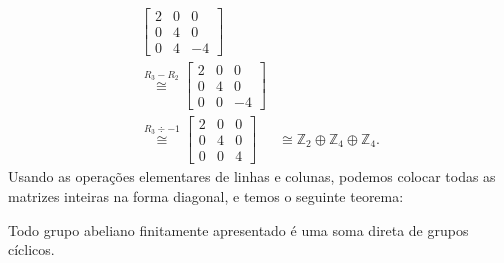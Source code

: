 \begin{align*}
\begin{bmatrix}
        	2 & 0 & 0 \\
        	0 & 4 & 0 \\
        	0 & 4 & -4
        	\end{bmatrix}& \\ \stackrel{R_3 - R_2}{\cong} 
        	\begin{bmatrix}
        	2 & 0 & 0 \\
        	0 & 4 & 0 \\
        	0 & 0 & -4 
        	\end{bmatrix}& \\ \stackrel{R_3\div-1}{\cong} 
        	\begin{bmatrix}
        	2 & 0 & 0 \\
        	0 & 4 & 0 \\
        	0 & 0 & 4
        	\end{bmatrix}& \cong \mathbb{Z}_2\oplus\mathbb{Z}_4\oplus\mathbb{Z}_4.
    	\end{align*}
    	Usando as operações 
    	elementares de linhas e colunas, podemos colocar todas as matrizes inteiras na forma diagonal, 
    	e temos o seguinte teorema:
    	\begin{theorem}
    	\label{teorema fundamental abelianos finitamente apresentados}
    		Todo grupo abeliano finitamente apresentado é uma soma direta de grupos cíclicos.
    	\end{theorem}
